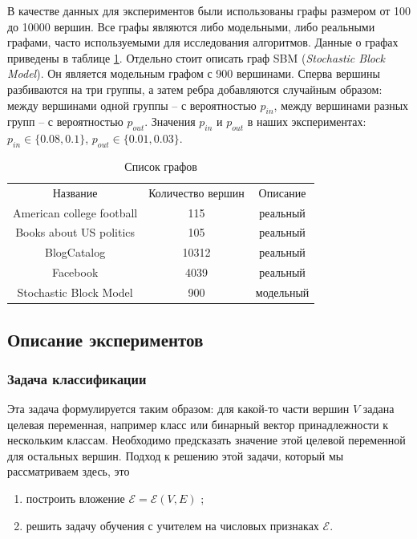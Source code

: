 \documentclass[12pt,a4paper]{extarticle}
\newcommand{\E}{\mathcal{E}}
\begin{document}
    В качестве данных для экспериментов были использованы графы размером от 100 до 10000 вершин.
    Все графы являются либо модельными, либо реальными графами, часто используемыми для исследования алгоритмов. Данные о графах приведены в таблице \ref{table_graphs}.
    Отдельно стоит описать граф SBM (\textit{Stochastic Block Model}). Он является модельным графом с 900 вершинами. Сперва вершины разбиваются на три группы, а затем ребра добавляются случайным образом: между вершинами одной группы -- с вероятностью $p_{in}$, между вершинами разных групп -- с вероятностью $p_{out}$. Значения $p_{in}$ и $p_{out}$ в наших экспериментах: $p_{in} \in \{0.08, 0.1\}$, $p_{out} \in \{0.01, 0.03\}$.
    
    \begin{table}
    \begin{center}
    \begin{tabular}{ccc}
    	Название & Количество вершин & Описание\\
        \noalign{\smallskip}
        \hline
        \noalign{\smallskip}
        American college football & 115 & реальный \\
        Books about US politics & 105 & реальный \\
        BlogCatalog & 10312 & реальный \\
        Facebook & 4039 & реальный \\
        Stochastic Block Model & 900 & модельный
    \end{tabular}
    \end{center}
    \caption{Список графов} \label{table_graphs}
    \end{table}
    
    \subsection{Описание экспериментов}
    
    \subsubsection{Задача классификации}
    
    Эта задача формулируется таким образом: для какой-то части вершин $V$ задана целевая переменная, например класс или бинарный вектор принадлежности к нескольким классам. Необходимо предсказать значение этой целевой переменной для остальных вершин.
    Подход к решению этой задачи, который мы рассматриваем здесь, это 
    \begin{enumerate}
        \item построить вложение $\E = \E(V, E)$ \label{itm:build_E};
        \item решить задачу обучения с учителем на числовых признаках $\E$.
    \end{enumerate}
    
\end{document}
